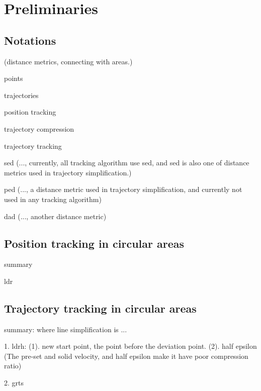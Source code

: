 



\section{Preliminaries}
\label{sec-pre}

\subsection{Notations}
(distance metrics, connecting with areas.)

points

trajectories

position tracking

trajectory compression

trajectory tracking


sed (..., currently, all tracking algorithm use sed, and sed is also one of distance metrics used in trajectory simplification.)

ped (..., a distance metric used in trajectory simplification, and currently not used in any tracking algorithm)

dad (..., another distance metric)


\subsection{Position tracking in circular areas}
summary

ldr

\subsection{Trajectory tracking in circular areas}
summary: 
where line simplification is ...

1. ldrh: (1). new start point, the point before the deviation point. (2). half epsilon
(The pre-set and solid velocity, and half epsilon make it have poor compression ratio)

2. grts




